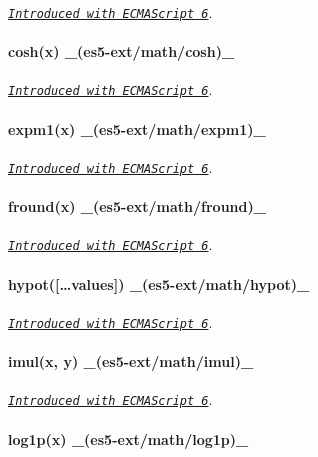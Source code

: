 \href{http://people.mozilla.org/~jorendorff/es6-draft.html#sec-math.clz32}{\tt {\itshape Introduced with E\+C\+M\+A\+Script 6}}. ~\newline
 \paragraph*{cosh(x) \+\_\+(es5-\/ext/math/cosh)\+\_\+}

\href{http://people.mozilla.org/~jorendorff/es6-draft.html#sec-math.cosh}{\tt {\itshape Introduced with E\+C\+M\+A\+Script 6}}. ~\newline
 \paragraph*{expm1(x) \+\_\+(es5-\/ext/math/expm1)\+\_\+}

\href{http://people.mozilla.org/~jorendorff/es6-draft.html#sec-math.expm1}{\tt {\itshape Introduced with E\+C\+M\+A\+Script 6}}. ~\newline
 \paragraph*{fround(x) \+\_\+(es5-\/ext/math/fround)\+\_\+}

\href{http://people.mozilla.org/~jorendorff/es6-draft.html#sec-math.fround}{\tt {\itshape Introduced with E\+C\+M\+A\+Script 6}}. ~\newline
 \paragraph*{hypot(\mbox{[}…values\mbox{]}) \+\_\+(es5-\/ext/math/hypot)\+\_\+}

\href{http://people.mozilla.org/~jorendorff/es6-draft.html#sec-math.hypot}{\tt {\itshape Introduced with E\+C\+M\+A\+Script 6}}. ~\newline
 \paragraph*{imul(x, y) \+\_\+(es5-\/ext/math/imul)\+\_\+}

\href{http://people.mozilla.org/~jorendorff/es6-draft.html#sec-math.imul}{\tt {\itshape Introduced with E\+C\+M\+A\+Script 6}}. ~\newline
 \paragraph*{log1p(x) \+\_\+(es5-\/ext/math/log1p)\+\_\+}

